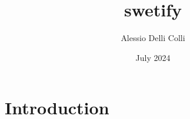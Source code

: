 \documentclass{article}
\title{swetify}
\author{Alessio Delli Colli}
\date{July 2024}
\begin{document}
\maketitle

\section{Introduction}
\end{document}
